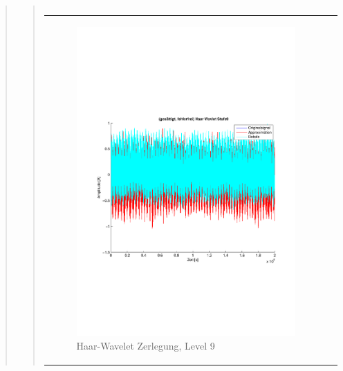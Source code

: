 \begin{quote}
\begin{quote}
\begin{center}
\begin{tabular}{ll}
                \end{tabular}
                \end{center}
    
                
                
        \begin{center}
                \begin{tabular}{ll}
    
                \hspace{-8em}
                    \begin{minipage}{0.6\textwidth}
    
                        \begin{figure}[H]
                            \label{fig:}
                            \includegraphics[scale=0.4, trim = 2cm 6cm 1cm
                            7.5cm,
                            clip]{./Bilder/Termin8/fehlerfrei_gesaettigt_Haar_Wavlet_lvl_9}
                            \caption{Haar-Wavelet Zerlegung, Level 9}
                        \end{figure}
    

\end{minipage}
\end{tabular}
\end{center}
\end{quote}
\end{quote}
